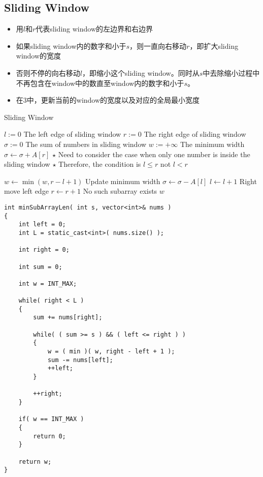 \subsection{Sliding Window}
\begin{CJK*}{UTF8}{gbsn}
\begin{itemize}
\item 用$l$和$r$代表sliding window的左边界和右边界
\item 如果sliding window内的数字和小于$s$，则一直向右移动$r$，即扩大sliding window的宽度
\item 否则不停的向右移动$l$，即缩小这个sliding window。同时从$s$中去除缩小过程中不再包含在window中的数直至window内的数字和小于$s$。
\item 在3中，更新当前的window的宽度以及对应的全局最小宽度
\end{itemize}
\end{CJK*}
\setcounter{algorithm}{0}
\begin{algorithm}[H]
\caption{Sliding Window}
\begin{algorithmic}[1]
\State $l:=0$ \Comment The left edge of sliding window
\State $r:=0$ \Comment The right edge of sliding window
\State $\sigma:=0$ \Comment The sum of numbers in sliding window
\State $w:=+\infty$ \Comment The minimum width
\State $\sigma\gets\sigma + A[r]$
\State $\star$ Need to consider the case when only one number is inside the sliding window
\State $\star$ Therefore, the condition is $l\leq r$ not $l<r$
\end{algorithmic}
\end{algorithm}
\begin{algorithm}[H]
\begin{algorithmic}[1]
\State $w\gets\min(w, r-l+1)$ \Comment Update minimum width
\State $\sigma\gets \sigma - A[l]$
\State $l\gets l+1$ \Comment Right move left edge
\EndWhile
\State $r\gets r+1$
\EndWhile
{} \Comment No such subarray exists
\State {}
\Else
\State \Return $w$
\EndIf
\EndProcedure
\end{algorithmic}
\end{algorithm}
\setcounter{lstlisting}{0}
\begin{lstlisting}[style=customc, caption={Sliding Window}]
int minSubArrayLen( int s, vector<int>& nums )
{
    int left = 0;
    int L = static_cast<int>( nums.size() );

    int right = 0;

    int sum = 0;

    int w = INT_MAX;

    while( right < L )
    {
        sum += nums[right];

        while( ( sum >= s ) && ( left <= right ) )
        {
            w = ( min )( w, right - left + 1 );
            sum -= nums[left];
            ++left;
        }

        ++right;
    }

    if( w == INT_MAX )
    {
        return 0;
    }

    return w;
}
\end{lstlisting}
